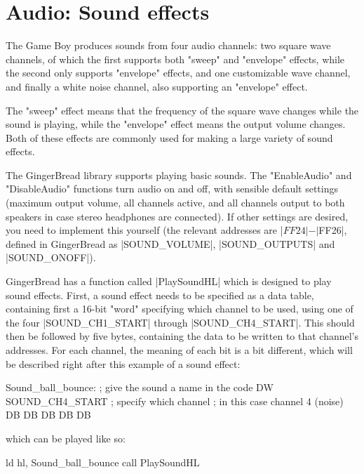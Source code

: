 \documentclass[11pt]{book}
\begin{document}
\section{Audio: Sound effects}
\label{soundfx}
The Game Boy produces sounds from four audio channels: two square wave channels, of which the first supports both "sweep" and "envelope" effects, while the second only supports "envelope" effects, and one customizable wave channel, and finally a white noise channel, also supporting an "envelope" effect.

The "sweep" effect means that the frequency of the square wave changes while the sound is playing, while the "envelope" effect means the output volume changes. Both of these effects are commonly used for making a large variety of sound effects.

The GingerBread library supports playing basic sounds. The "EnableAudio" and "DisableAudio" functions turn audio on and off, with sensible default settings (maximum output volume, all channels active, and all channels output to both speakers in case stereo headphones are connected). If other settings are desired, you need to implement this yourself (the relevant addresses are |$FF24|-|$FF26|, defined in GingerBread as |SOUND_VOLUME|, |SOUND_OUTPUTS| and |SOUND_ONOFF|).

GingerBread has a function called |PlaySoundHL| which is designed to play sound effects. First, a sound effect needs to be specified as a data table, containing first a 16-bit "word" specifying which channel to be used, using one of the four |SOUND_CH1_START| through |SOUND_CH4_START|. This should then be followed by five bytes, containing the data to be written to that channel's addresses. For each channel, the meaning of each bit is a bit different, which will be described right after this example of a sound effect:

\begin{code}
Sound_ball_bounce: ; give the sound a name in the code
DW SOUND_CH4_START ; specify which channel 
; in this case channel 4 (noise)
DB %
DB %
DB %
DB %
DB %
\end{code}

which can be played like so:

\begin{code}
ld hl, Sound_ball_bounce
call PlaySoundHL
\end{code}
\end{document}
